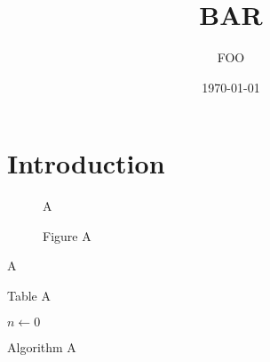 \documentclass[a4paper,10pt,twoside,openright]{book}
\title{BAR}
\author{FOO}
\date{\today}
\begin{document}
\pagestyle{plain}
\maketitle

\cleardoublepage
\tableofcontents
{} %

\listofalgorithms
\listoftables
\listoffigures

\chapter{Introduction}
\setcounter{page}{1}

\begin{figure}
A
\caption{Figure A}
\label{fig:A}
\end{figure}
\begin{table}
A
\caption{Table A}
\label{tab:A}
\end{table}

\begin{algorithm}
    \begin{algorithmic}
	\State $n \gets 0$
    \end{algorithmic}
    \caption{Algorithm A}
    \label{alg:nab}
\end{algorithm}
\end{document}
